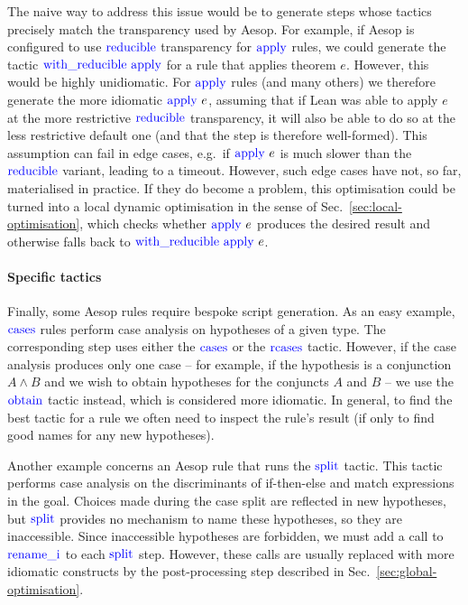 \documentclass[sigplan,10pt,anonymous,review]{acmart}
\newcommand{\tac}[1]{\ensuremath{\mathrm{\mathcolor{blue}{#1}}}}
\begin{document}
The naive way to address this issue would be to generate steps whose tactics precisely match the transparency used by Aesop.
For example, if Aesop is configured to use \tac{reducible} transparency for \tac{apply} rules, we could generate the tactic $\tac{with\_reducible}~\tac{apply}$ for a rule that applies theorem $e$.
However, this would be highly unidiomatic.
For \tac{apply} rules (and many others) we therefore generate the more idiomatic $\tac{apply}~e$, assuming that if Lean was able to apply $e$ at the more restrictive \tac{reducible} transparency, it will also be able to do so at the less restrictive default one (and that the step is therefore well-formed).
This assumption can fail in edge cases, e.g.\ if $\tac{apply}~e$ is much slower than the \tac{reducible} variant, leading to a timeout.
However, such edge cases have not, so far, materialised in practice.
If they do become a problem, this optimisation could be turned into a local dynamic optimisation in the sense of Sec.~\ref{sec:local-optimisation}, which checks whether $\tac{apply}~e$ produces the desired result and otherwise falls back to $\tac{with\_reducible}~\tac{apply}~e$.

\paragraph{Specific tactics}
Finally, some Aesop rules require bespoke script generation.
As an easy example, \tac{cases} rules perform case analysis on hypotheses of a given type.
The corresponding step uses either the $\tac{cases}$ or the $\tac{rcases}$ tactic.
However, if the case analysis produces only one case -- for example, if the hypothesis is a conjunction $A ∧ B$ and we wish to obtain hypotheses for the conjuncts $A$ and $B$ -- we use the \tac{obtain} tactic instead, which is considered more idiomatic.
In general, to find the best tactic for a rule we often need to inspect the rule's result (if only to find good names for any new hypotheses).

Another example concerns an Aesop rule that runs the \tac{split} tactic.
This tactic performs case analysis on the discriminants of if-then-else and match expressions in the goal.
Choices made during the case split are reflected in new hypotheses, but \tac{split} provides no mechanism to name these hypotheses, so they are inaccessible.
Since inaccessible hypotheses are forbidden, we must add a call to \tac{rename\_i} to each \tac{split} step.
However, these calls are usually replaced with more idiomatic constructs by the post-processing step described in Sec.~\ref{sec:global-optimisation}.
\end{document}
